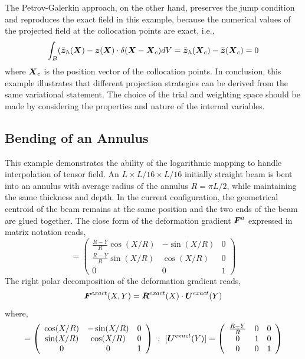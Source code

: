 \documentclass[12pt]{article}
\begin{document}
The Petrov-Galerkin approach, on the other hand, preserves the jump
condition and reproduces the exact field in this example, because the
numerical values of the projected field at the collocation points are
exact, i.e.,
\begin{equation}
  \int_{B} (\bar{{\boldsymbol{z}}}_{h}({\boldsymbol{X}}) - {\boldsymbol{z}}({\boldsymbol{X}}) \cdot \delta({\boldsymbol{X}} - {\boldsymbol{X}}_{c})dV
  =
  \bar{{\boldsymbol{z}}}_{h}({\boldsymbol{X}}_{c}) - \bar{{\boldsymbol{z}}}({\boldsymbol{X}}_{c}) = 0
  \label{eq:PGOpmital}
\end{equation}
where ${\boldsymbol{X}}_{c}$ is the position vector of the collocation points. In
conclusion, this example illustrates that different projection
strategies can be derived from the same variational statement. The
choice of the trial and weighting space should be made by considering
the properties and nature of the internal variables.

\subsection{Bending of an Annulus}
This example demonstrates the ability of the logarithmic mapping 
to handle interpolation of tensor field. An $L \times L/16 \times L/16$ 
initially straight beam is bent into an annulus with average radius of the 
annulus $R = \pi L /2$, while maintaining the same thickness and depth. 
In the current configuration, the geometrical centroid of the beam remains 
at the same position and the two ends of the beam are glued together. The 
close form of the deformation gradient ${\boldsymbol{F}}^{a}$ expressed in matrix notation
 reads, 
 \begin{equation}
   [\bF^{exact}(X, Y)] =  \left( \begin{array}{ccc}
       \frac{R-Y}{R} \cos(X/R) & -\sin(X/R) & 0 \\
       \frac{R-Y}{R} \sin(X/R) & \cos(X/R)  & 0\\
       0 & 0 & 1 \end{array} \right)
\label{eq:DeformGrad} 
\end{equation}
The right polar decomposition of the deformation gradient reads,
\begin{equation}
  {\boldsymbol{F}}^{exact}(X,Y) = {\boldsymbol{R}}^{exact}(X) \cdot {\boldsymbol{U}}^{exact}(Y) 
  \label{eq:RightPolar}
\end{equation}
where,
\begin{equation}
  [\bR^{exact}(X)] =  \left( \begin{array}{ccc}
      \cos(X/R) & -\sin(X/R) & 0 \\
      \sin(X/R) & \cos(X/R)  & 0\\
      0 & 0 & 1 \end{array} \right) \: \: ; \: \:
  [\bU^{exact}(Y)] =  \left( \begin{array}{ccc}
      \frac{R-Y}{R}  & 0 & 0 \\
      0 & 1 & 0\\
      0 & 0 & 1 \end{array} \right)
  \label{eq:PolarDecomposition} 
\end{equation}
\end{document}
